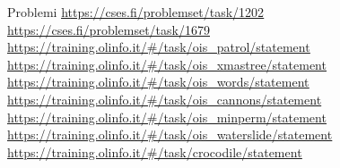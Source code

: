 \documentclass[compress]{beamer}
\begin{document}
\begin{frame}{Problemi}
    \underline{\url{https://cses.fi/problemset/task/1202}}
    \underline{\url{https://cses.fi/problemset/task/1679}}
    \underline{\url{https://training.olinfo.it/\#/task/ois_patrol/statement}}
    \underline{\url{https://training.olinfo.it/\#/task/ois_xmastree/statement}}
    \underline{\url{https://training.olinfo.it/\#/task/ois_words/statement}}
    \underline{\url{https://training.olinfo.it/\#/task/ois_cannons/statement}}
    \underline{\url{https://training.olinfo.it/\#/task/ois_minperm/statement}}
    \underline{\url{https://training.olinfo.it/\#/task/ois_waterslide/statement}}
    \underline{\url{https://training.olinfo.it/\#/task/crocodile/statement}}
\end{frame}
\end{document}
